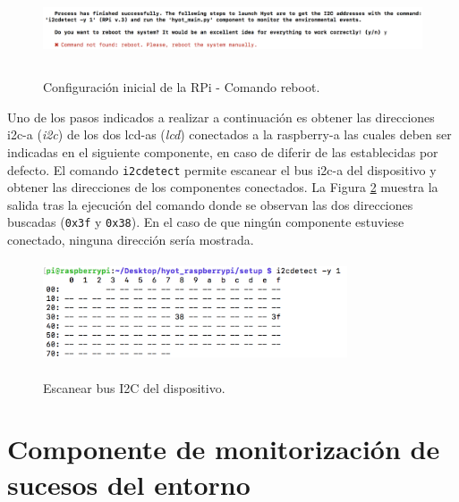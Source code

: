 \documentclass[12pt,a4paper, twoside]{report}
\begin{document}
	\begin{figure}[!ht]   
		\caption{Configuración inicial de la RPi - Comando reboot.} 
		\begin{center} 
			\includegraphics[width=17cm,height=2cm]{Images/userGuide/setup/rebootError} \\
			\label{fig:userguide_setup_error_reboot} 
		\end{center}  
	\end{figure}
	
	Uno de los pasos indicados a realizar a continuación es obtener las direcciones \gls{i2c-a} (\textit{\gls{i2c}}) de los dos \glspl{lcd-a} (\textit{\gls{lcd}}) conectados a la \gls{raspberry-a} las cuales deben ser indicadas en el siguiente componente, en caso de diferir de las establecidas por defecto. El comando \texttt{i2cdetect} permite escanear el bus \gls{i2c-a} del dispositivo y obtener las direcciones de los componentes conectados. La Figura \ref{fig:userguide_setup_i2cdetect} muestra la salida tras la ejecución del comando donde se observan las dos direcciones buscadas (\texttt{0x3f} y \texttt{0x38}). En el caso de que ningún componente estuviese conectado, ninguna dirección sería mostrada.

	\begin{figure}[!ht]   
		\caption{Escanear bus I2C del dispositivo.} 
		\begin{center} 
			\includegraphics[width=9cm,height=3cm]{Images/userGuide/setup/i2cdetect} \\
			\label{fig:userguide_setup_i2cdetect} 
		\end{center}  
	\end{figure}

	 \section{Componente de monitorización de sucesos del entorno}
	 
\end{document}
